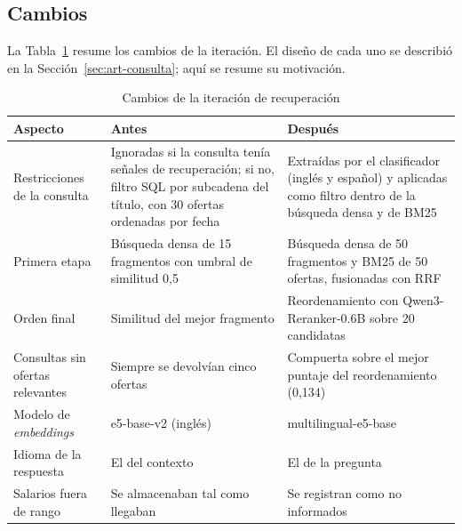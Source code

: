 \subsection{Cambios}

La Tabla~\ref{tab:art-cambios} resume los cambios de la iteración. El diseño de cada uno se describió en la Sección~\ref{sec:art-consulta}; aquí se resume su motivación.

\begin{table}[htbp!]
    \centering
    \caption{Cambios de la iteración de recuperación}
    \label{tab:art-cambios}
    \small
    \begin{tabular}{|p{3cm}|p{5.4cm}|p{5.4cm}|}
        \hline
        \textbf{Aspecto} & \textbf{Antes} & \textbf{Después} \\
        \hline
        Restricciones de la consulta & Ignoradas si la consulta tenía señales de recuperación; si no, filtro SQL por subcadena del título, con 30 ofertas ordenadas por fecha & Extraídas por el clasificador (inglés y español) y aplicadas como filtro dentro de la búsqueda densa y de BM25 \\
        \hline
        Primera etapa & Búsqueda densa de 15 fragmentos con umbral de similitud 0,5 & Búsqueda densa de 50 fragmentos y BM25 de 50 ofertas, fusionadas con RRF \\
        \hline
        Orden final & Similitud del mejor fragmento & Reordenamiento con Qwen3-Reranker-0.6B sobre 20 candidatas \\
        \hline
        Consultas sin ofertas relevantes & Siempre se devolvían cinco ofertas & Compuerta sobre el mejor puntaje del reordenamiento (0,134) \\
        \hline
        Modelo de \textit{embeddings} & e5-base-v2 (inglés) & multilingual-e5-base \\
        \hline
        Idioma de la respuesta & El del contexto & El de la pregunta \\
        \hline
        Salarios fuera de rango & Se almacenaban tal como llegaban & Se registran como no informados \\
        \hline
    \end{tabular}
\end{table}

